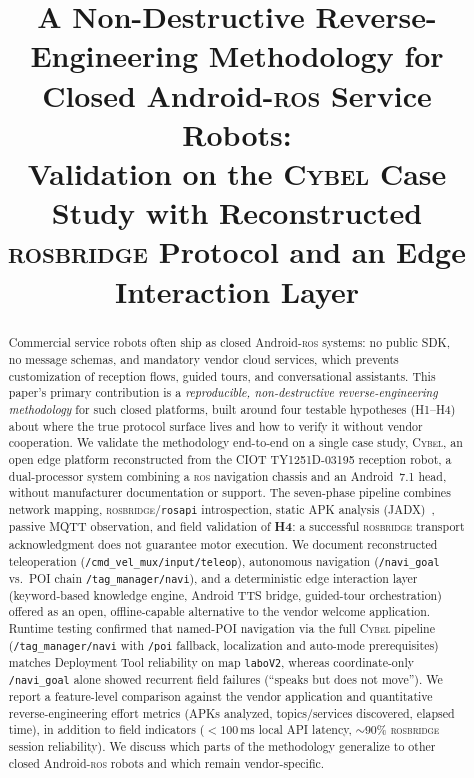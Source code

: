 \documentclass[conference]{IEEEtran}
\newcommand{\ros}{\textsc{ros}}
\newcommand{\rosbridge}{\textsc{rosbridge}}
\newcommand{\rosapi}{\texttt{rosapi}}
\newcommand{\cybel}{\textsc{Cybel}}
\begin{document}
\title{A Non-Destructive Reverse-Engineering Methodology for Closed Android-\ros{} Service Robots:\\
Validation on the \cybel{} Case Study with Reconstructed \rosbridge{} Protocol and an Edge Interaction Layer}

\author{
\and
{}
}

\maketitle

\begin{abstract}

Commercial service robots often ship as closed Android-\ros{} systems: no public SDK, no message schemas, and mandatory vendor cloud services, which prevents customization of reception flows, guided tours, and conversational assistants.
This paper's primary contribution is a \emph{reproducible, non-destructive reverse-engineering methodology} for such closed platforms, built around four testable hypotheses (H1--H4) about where the true protocol surface lives and how to verify it without vendor cooperation.
We validate the methodology end-to-end on a single case study, \cybel{}, an open edge platform reconstructed from the CIOT TY1251D-03195 reception robot, a dual-processor system combining a \ros{} navigation chassis and an Android~7.1 head, without manufacturer documentation or support.
The seven-phase pipeline combines network mapping, \rosbridge{}/\rosapi{} introspection, static APK analysis (JADX)~\cite{cybel_architecture}, passive MQTT observation, and field validation of \textbf{H4}: a successful \rosbridge{} transport acknowledgment does not guarantee motor execution.
We document reconstructed teleoperation (\texttt{/cmd\_vel\_mux/input/teleop}), autonomous navigation (\texttt{/navi\_goal} vs.\ POI chain \texttt{/tag\_manager/navi}), and a deterministic edge interaction layer (keyword-based knowledge engine, Android TTS bridge, guided-tour orchestration) offered as an open, offline-capable alternative to the vendor welcome application.
Runtime testing confirmed that named-POI navigation via the full \cybel{} pipeline (\texttt{/tag\_manager/navi} with \texttt{/poi} fallback, localization and auto-mode prerequisites) matches Deployment Tool reliability on map \texttt{laboV2}, whereas coordinate-only \texttt{/navi\_goal} alone showed recurrent field failures (``speaks but does not move'').
We report a feature-level comparison against the vendor application and quantitative reverse-engineering effort metrics (APKs analyzed, topics/services discovered, elapsed time), in addition to field indicators (${<}100$\,ms local API latency, ${\sim}90\%$ \rosbridge{} session reliability).
We discuss which parts of the methodology generalize to other closed Android-\ros{} robots and which remain vendor-specific.

\end{abstract}
\end{document}
